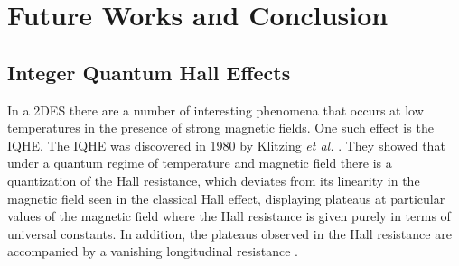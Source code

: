 \chapter{Future Works and Conclusion}\label{chap:conclusion}
\section{Integer Quantum Hall Effects}\label{sec:IQHE}
In a \ac{2DES} there are a number of interesting phenomena that occurs at low temperatures in the presence of strong magnetic fields. One such effect is the \ac{IQHE}. The \acs{IQHE} was discovered in 1980 by Klitzing \emph{et al.} \cite{Klitzing_PhysRevLett1980}. They showed that under a quantum regime of temperature and magnetic field there is a quantization of the Hall resistance, which deviates from its linearity in the magnetic field seen in the classical Hall effect, displaying plateaus at particular values of the magnetic field where the Hall resistance is given purely in terms of universal constants. In addition, the plateaus observed in the Hall resistance are accompanied by a vanishing longitudinal resistance \cite{Klitzing_PhysRevLett1980,Ando_RevModPhys1982,Goerbig_2009,Hook_Solid1991}.

